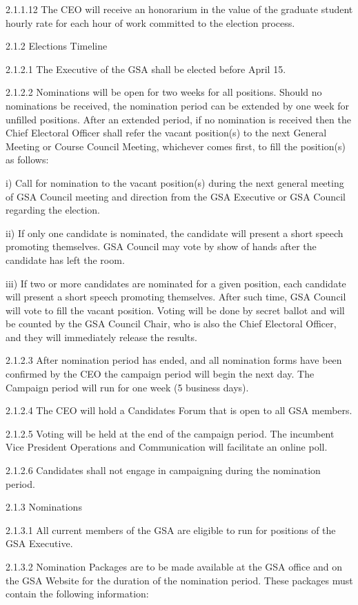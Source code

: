  2.1.1.12 The CEO will receive an honorarium in the value of the graduate student hourly rate for each hour of work committed to the election process. 
 
 2.1.2 Elections Timeline 
 
 2.1.2.1 The Executive of the GSA shall be elected before April 15. 
 
 2.1.2.2 Nominations will be open for two weeks for all positions. Should no nominations be received, the nomination period can be extended by one week for unfilled positions. After an extended period, if no nomination is received then the Chief Electoral Officer shall refer the vacant position(s) to the next General Meeting or Course Council Meeting, whichever comes first, to fill the position(s) as follows: 

 i) Call for nomination to the vacant position(s) during the next general meeting of GSA Council meeting and direction from the GSA Executive or GSA Council regarding the election. 
 
 ii) If only one candidate is nominated, the candidate will present a short speech promoting themselves. GSA Council may vote by show of hands after the candidate has left the room. 
 
 iii) If two or more candidates are nominated for a given position, each candidate will present a short speech promoting themselves. After such time, GSA Council will vote to fill the vacant position. Voting will be done by secret ballot and will be counted by the GSA Council Chair, who is also the Chief Electoral Officer, and they will immediately release the results. 
 
 2.1.2.3 After nomination period has ended, and all nomination forms have been confirmed by the CEO the campaign period will begin the next day. The Campaign period will run for one week (5 business days). 
 
 2.1.2.4 The CEO will hold a Candidates Forum that is open to all GSA members. 
 
 2.1.2.5 Voting will be held at the end of the campaign period. The incumbent Vice President Operations and Communication will facilitate an online poll. 
 
 2.1.2.6 Candidates shall not engage in campaigning during the nomination period. 
 
 2.1.3 Nominations 
 
 2.1.3.1 All current members of the GSA are eligible to run for positions of the GSA Executive. 
 
 2.1.3.2 Nomination Packages are to be made available at the GSA office and on the GSA Website for the duration of the nomination period. These packages must contain the following information: 
 
